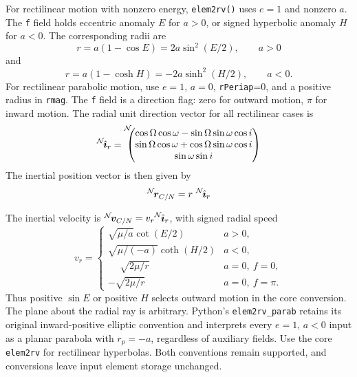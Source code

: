For rectilinear motion with nonzero energy, {\tt elem2rv()} uses $e=1$ and nonzero $a$. The {\tt f} field holds eccentric anomaly $E$ for $a>0$, or signed hyperbolic anomaly $H$ for $a<0$. The corresponding radii are\cite{schaub}
\begin{equation}
	r = a (1 - \cos E) = 2a\sin^2(E/2), \qquad a>0
\end{equation}
and
\begin{equation}
	r = a(1 - \cosh H) = -2a\sinh^2(H/2), \qquad a<0.
\end{equation}
For rectilinear parabolic motion, use $e=1$, $a=0$, {\tt rPeriap}=0, and a positive radius in {\tt rmag}. The {\tt f} field is a direction flag: zero for outward motion, $\pi$ for inward motion. The radial unit direction vector for all rectilinear cases is
\begin{equation}
	\leftexp{N}{\hat{\bm\imath}}_{r}=\leftexp{N\!\!\!}{\begin{pmatrix}
\cos\Omega\cos\omega
- \sin\Omega\sin\omega\cos i \\
\sin\Omega\cos\omega + \cos\Omega\sin\omega\cos
i \\
 \sin\omega\sin i
 \end{pmatrix}}
\end{equation}
The inertial position vector is then given by
\begin{equation}
\leftexp{N}{\bm r}_{C/N} =r \ \leftexp{N}{\hat{\bm\imath}}_{r}
\end{equation}


The inertial velocity is $\leftexp{N}{\bm v}_{C/N}=v_r\leftexp{N}{\hat{\bm\imath}}_r$, with signed radial speed
\begin{equation}
	v_r = \begin{cases}
		\sqrt{\mu/a}\cot(E/2) & a>0, \\
		\sqrt{\mu/(-a)}\coth(H/2) & a<0, \\
		\phantom{-}\sqrt{2\mu/r} & a=0,\ f=0, \\
		-\sqrt{2\mu/r} & a=0,\ f=\pi.
	\end{cases}
\end{equation}
Thus positive $\sin E$ or positive $H$ selects outward motion in the core conversion. The plane about the radial ray is arbitrary. Python's {\tt elem2rv\_parab} retains its original inward-positive elliptic convention and interprets every $e=1$, $a<0$ input as a planar parabola with $r_p=-a$, regardless of auxiliary fields. Use the core {\tt elem2rv} for rectilinear hyperbolas. Both conventions remain supported, and conversions leave input element storage unchanged.





